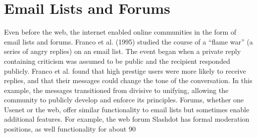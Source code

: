 \section{Email Lists and Forums}
Even before the web, the internet enabled online communities in the form of email lists and forums. Franco et al. (1995) studied the course of a ``flame war'' (a series of angry replies) on an email list. The event began when a private reply containing criticism was assumed to be public and the recipient responded publicly. Franco et al. found that high prestige users were more likely to receive replies, and that their messages could change the tone of the conversation. In this example, the messages transitioned from divisive to unifying, allowing the community to publicly develop and enforce its principles. Forums, whether one Usenet or the web, offer similar functionality to email lists but sometimes enable additional features. For example, the web forum Slashdot has formal moderation positions, as well functionality for about 90%

